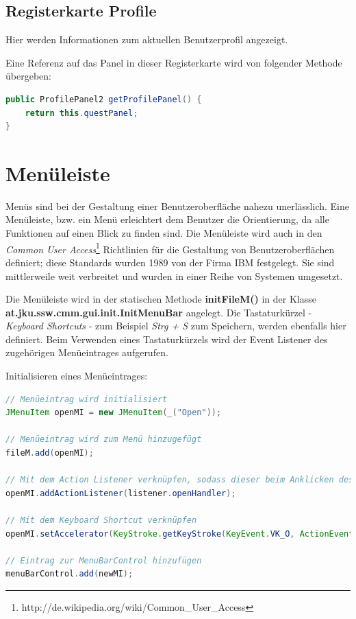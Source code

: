\subsection{Registerkarte \glqq{}Profile\grqq{}}
\label{sec:gui-main-right-questpanel}
Hier werden Informationen zum aktuellen Benutzerprofil angezeigt.

Eine Referenz auf das Panel in dieser Registerkarte wird von folgender Methode übergeben:
\begin{lstlisting}[language=JAVA]
public ProfilePanel2 getProfilePanel() {
	return this.questPanel;
}
\end{lstlisting}



\section{Menüleiste}
\label{sec:gui-main-menu}
Menüs sind bei der Gestaltung einer Benutzeroberfläche nahezu unerlässlich. Eine Menüleiste, bzw. ein Menü erleichtert dem Benutzer die Orientierung, da alle Funktionen auf einen Blick zu finden sind. Die Menüleiste wird auch in den \emph{Common User Access}\footnote{http://de.wikipedia.org/wiki/Common\_User\_Access} Richtlinien für die Gestaltung von Benutzeroberflächen definiert; diese Standards wurden 1989 von der Firma IBM festgelegt. Sie sind mittlerweile weit verbreitet und wurden in einer Reihe von Systemen umgesetzt.

Die Menüleiste wird in der statischen Methode \textbf{initFileM()} in der Klasse \\ \textbf{at.jku.ssw.cmm.gui.init.InitMenuBar} angelegt. Die Tastaturkürzel - \emph{\glqq{}Keyboard Shortcuts\grqq{}} - zum Beispiel \emph{Strg + S} zum Speichern, werden ebenfalls hier definiert. Beim Verwenden eines Tastaturkürzels wird der Event Listener des zugehörigen Menüeintrages aufgerufen.

Initialisieren eines Menüeintrages:
\begin{lstlisting}[language=JAVA]
// Menüeintrag wird initialisiert
JMenuItem openMI = new JMenuItem(_("Open"));

// Menüeintrag wird zum Menü hinzugefügt
fileM.add(openMI);

// Mit dem Action Listener verknüpfen, sodass dieser beim Anklicken des Menüs aufgerufen wird
openMI.addActionListener(listener.openHandler);

// Mit dem Keyboard Shortcut verknüpfen
openMI.setAccelerator(KeyStroke.getKeyStroke(KeyEvent.VK_O, ActionEvent.CTRL_MASK));

// Eintrag zur MenuBarControl hinzufügen
menuBarControl.add(newMI);
\end{lstlisting}

